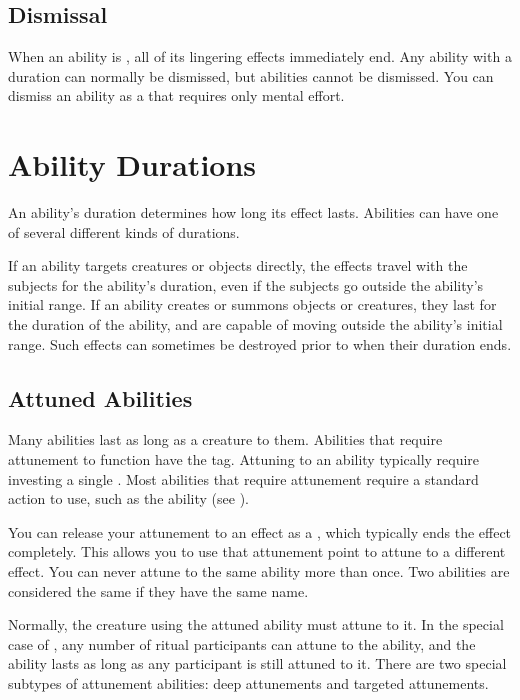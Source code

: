   \subsection{Dismissal}\label{Dismissal}
    When an ability is , all of its lingering effects immediately end.
    Any \magical ability with a duration can normally be dismissed, but  abilities cannot be dismissed.
    You can dismiss an ability as a  that requires only mental effort.

\section{Ability Durations}\label{Ability Durations}

  An ability's duration determines how long its effect lasts.
  Abilities can have one of several different kinds of durations.

  If an ability targets creatures or objects directly, the effects travel with the subjects for the ability's duration, even if the subjects go outside the ability's initial range.
  If an ability creates or summons objects or creatures, they last for the duration of the ability, and are capable of moving outside the ability's initial range.
  Such effects can sometimes be destroyed prior to when their duration ends.

  \subsection{Attuned Abilities}\label{Attuned Abilities}
    Many abilities last as long as a creature  to them.
    Abilities that require attunement to function have the  tag.
    Attuning to an ability typically require investing a single .
    Most abilities that require attunement require a standard action to use, such as the  ability (see ).

    You can release your attunement to an effect as a , which typically ends the effect completely.
    This allows you to use that attunement point to attune to a different effect.
    You can never attune to the same ability more than once.
    Two abilities are considered the same if they have the same name.

    Normally, the creature using the attuned ability must attune to it.
    In the special case of , any number of ritual participants can attune to the ability, and the ability lasts as long as any participant is still attuned to it.
    There are two special subtypes of attunement abilities: deep attunements and targeted attunements.


